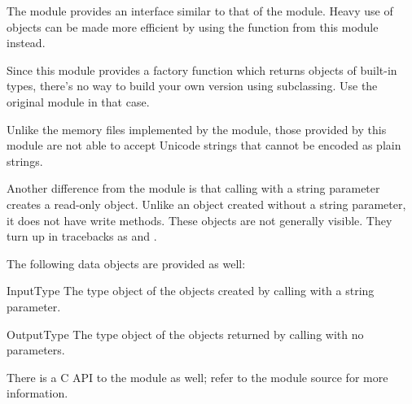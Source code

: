 The module  provides an interface similar to that of
the  module.  Heavy use of 
objects can be made more efficient by using the function
 from this module instead.

Since this module provides a factory function which returns objects of
built-in types, there's no way to build your own version using
subclassing.  Use the original  module in that case.

Unlike the memory files implemented by the 
module, those provided by this module are not able to accept Unicode
strings that cannot be encoded as plain \ASCII{} strings.

Another difference from the  module is that calling
 with a string parameter creates a read-only object.
Unlike an object created without a string parameter, it does not have
write methods.  These objects are not generally visible.  They turn up in
tracebacks as  and .

The following data objects are provided as well:


\begin{datadesc}{InputType}
  The type object of the objects created by calling
   with a string parameter.
\end{datadesc}

\begin{datadesc}{OutputType}
  The type object of the objects returned by calling
   with no parameters.
\end{datadesc}


There is a C API to the module as well; refer to the module source for 
more information.
